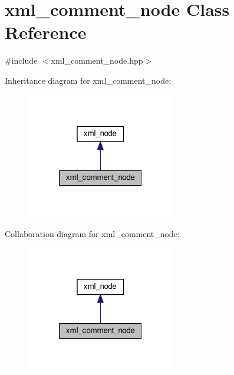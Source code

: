 \hypertarget{classxml__comment__node}{}\section{xml\+\_\+comment\+\_\+node Class Reference}
\label{classxml__comment__node}


{\ttfamily \#include $<$xml\+\_\+comment\+\_\+node.\+hpp$>$}



Inheritance diagram for xml\+\_\+comment\+\_\+node\+:
\nopagebreak
\begin{figure}[H]
\begin{center}
\leavevmode
\includegraphics[width=184pt]{d7/dba/classxml__comment__node__inherit__graph}
\end{center}
\end{figure}


Collaboration diagram for xml\+\_\+comment\+\_\+node\+:
\nopagebreak
\begin{figure}[H]
\begin{center}
\leavevmode
\includegraphics[width=184pt]{db/df3/classxml__comment__node__coll__graph}
\end{center}
\end{figure}

